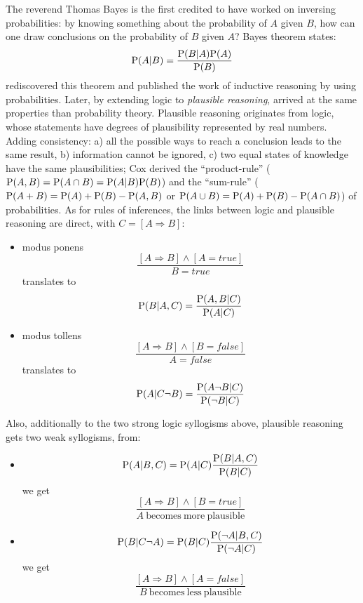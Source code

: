 The reverend Thomas Bayes is the first credited to have worked on inversing probabilities: by knowing something about the probability of $A$ given $B$, how can one draw conclusions on the probability of $B$ given $A$? Bayes theorem states: $$\mathrm{P}(A|B) = \frac{\mathrm{P}(B|A)\mathrm{P}(A)}{\mathrm{P}(B)}$$
\cite{Laplace} rediscovered this theorem and published the work of inductive reasoning by using probabilities. Later, by extending logic to \textit{plausible reasoning}, \cite{Jaynes} arrived at the same properties than \cite{Kolmogorov33} probability theory. Plausible reasoning originates from logic, whose statements have degrees of plausibility represented by real numbers. %
Adding consistency: a) all the possible ways to reach a conclusion leads to the same result, b) information cannot be ignored, c) two equal states of knowledge have the same plausibilities; Cox %
derived the ``product-rule'' ($\mathrm{P}(A,B)=\mathrm{P}(A\cap B)=\mathrm{P}(A|B)\mathrm{P}(B)$) and the ``sum-rule'' ($\mathrm{P}(A+B)=\mathrm{P}(A)+\mathrm{P}(B)-\mathrm{P}(A,B)$ or $\mathrm{P}(A\cup B) = \mathrm{P}(A)+\mathrm{P}(B)-\mathrm{P}(A\cap B)$) of probabilities. As for rules of inferences, the links between logic and plausible reasoning are direct, with $C=[A\Rightarrow B]$:
\begin{itemize}
    \item modus ponens $$\frac{[A\Rightarrow B] \wedge [A=true]}{B=true}$$ translates to $$\mathrm{P}(B|A,C)=\frac{\mathrm{P}(A,B|C)}{\mathrm{P}(A|C)}$$
    \item modus tollens $$\frac{[A\Rightarrow B] \wedge [B=false]}{A=false}$$ translates to $$\mathrm{P}(A|C\neg B)=\frac{\mathrm{P}(A \neg B|C)}{\mathrm{P}(\neg B|C)}$$
\end{itemize}
Also, additionally to the two strong logic syllogisms above, plausible reasoning gets two weak syllogisms, from:
\begin{itemize}
    \item $$\mathrm{P}(A|B,C)=\mathrm{P}(A|C)\frac{\mathrm{P}(B|A,C)}{\mathrm{P}(B|C)}$$ we get $$\frac{[A\Rightarrow B] \wedge [B=true]}{A\ \mathrm{becomes\ more\ plausible}}$$
    \item $$\mathrm{P}(B| C\neg A)=\mathrm{P}(B|C)\frac{\mathrm{P}(\neg A|B,C)}{\mathrm{P}(\neg A|C)}$$ we get $$\frac{[A\Rightarrow B] \wedge [A=false]}{B\ \mathrm{becomes\ less\ plausible}}$$
\end{itemize}

